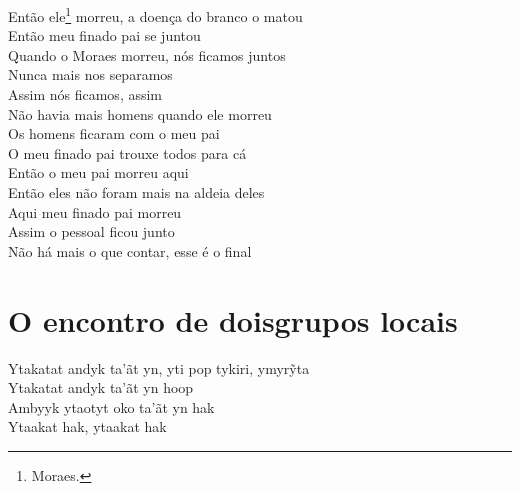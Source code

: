 \noindent   Então ele\footnote{Moraes.} morreu, a doença do branco o matou\\
  Então meu finado pai se juntou\\
  Quando o Moraes morreu, nós ficamos juntos\\
  Nunca mais nos separamos\\
  Assim nós ficamos, assim\\
  Não havia mais homens quando ele morreu\\
  Os homens ficaram com o meu pai\\
  O meu finado pai trouxe todos para cá\\
  Então o meu pai morreu aqui\\
  Então eles não foram mais na aldeia deles\\
  Aqui meu finado pai morreu\\
  Assim o pessoal ficou junto\\
  Não há mais o que contar, esse é o final

\chapter[O encontro de dois grupos locais]{O encontro de dois\break grupos locais}

  \noindent Ytakatat andyk ta’ãt yn, yti pop tykiri, ymyrỹta\\
  Ytakatat andyk ta'ãt yn hoop\\
  Ambyyk ytaotyt oko ta'ãt yn hak\\
  Ytaakat hak, ytaakat hak

